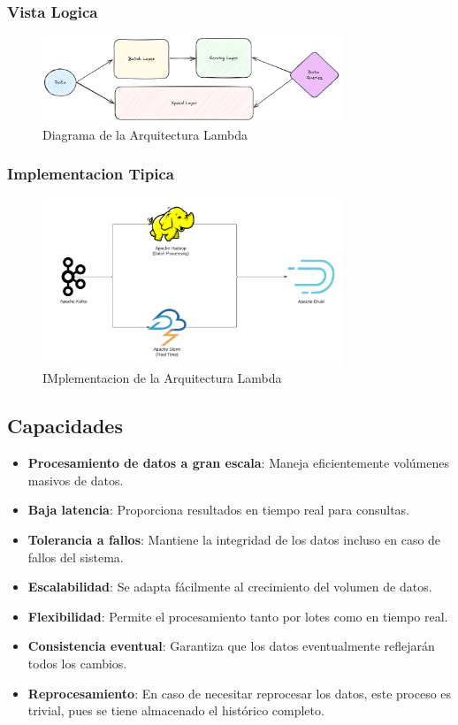 \newpage
\subsubsection{Vista Logica}
\begin{figure}[h]
\centering
\includegraphics[width=0.8\textwidth]{teorico/lambda.png}
\caption{Diagrama de la Arquitectura Lambda}
\label{fig:arquitectura_lambda}
\end{figure}

\subsubsection{Implementacion Tipica}
\begin{figure}[h]
\centering
\includegraphics[width=0.8\textwidth]{teorico/LambdaImplement.png}
\caption{IMplementacion de la Arquitectura Lambda}
\label{fig:implementation_arquitectura_lambda}
\end{figure}



\subsection{Capacidades}
\begin{itemize}
\item \textbf{Procesamiento de datos a gran escala}: Maneja eficientemente volúmenes masivos de datos.
\item \textbf{Baja latencia}: Proporciona resultados en tiempo real para consultas.
\item \textbf{Tolerancia a fallos}: Mantiene la integridad de los datos incluso en caso de fallos del sistema.
\item \textbf{Escalabilidad}: Se adapta fácilmente al crecimiento del volumen de datos.
\item \textbf{Flexibilidad}: Permite el procesamiento tanto por lotes como en tiempo real.
\item \textbf{Consistencia eventual}: Garantiza que los datos eventualmente reflejarán todos los cambios.
\item \textbf{Reprocesamiento}: En caso de necesitar reprocesar los datos, este proceso es trivial, pues se tiene almacenado el histórico completo.
\end{itemize}

